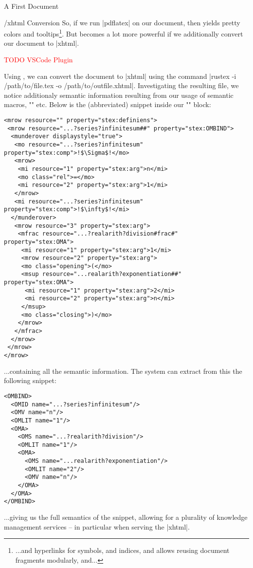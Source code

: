 \begin{sfragment}{A First \sTeX Document}
    \begin{sfragment}{\omdoc/xhtml Conversion}
      So, if we run |pdflatex| on our document, then \sTeX yields 
      pretty colors and
      tooltips\footnote{...and hyperlinks for symbols, and indices,
      and allows reusing document fragments modularly, and...}.
      But \sTeX becomes a lot more powerful if we additionally
      convert our document to |xhtml|.

      \textcolor{red}{TODO VSCode Plugin}

      Using \rustex, we can convert the document to |xhtml|
      using the command |rustex -i /path/to/file.tex -o /path/to/outfile.xhtml|.
      Investigating the resulting file, we notice additionaly semantic
      information resulting from our usage of semantic macros,
      \stexcode"\symref" etc. Below is the (abbreviated) snippet inside
      our \stexcode"" block:

      \begin{lstlisting}[escapechar=!]
<mrow resource="" property="stex:definiens">
 <mrow resource="...?series?infinitesum##" property="stex:OMBIND">
  <munderover displaystyle="true">
   <mo resource="...?series?infinitesum" property="stex:comp">!$\Sigma$!</mo>
   <mrow>
    <mi resource="1" property="stex:arg">n</mi>
    <mo class="rel">=</mo>
    <mi resource="2" property="stex:arg">1</mi>
   </mrow>
   <mi resource="...?series?infinitesum" property="stex:comp">!$\infty$!</mi>
  </munderover>
   <mrow resource="3" property="stex:arg">
    <mfrac resource="...?realarith?division#frac#" property="stex:OMA">
     <mi resource="1" property="stex:arg">1</mi>
     <mrow resource="2" property="stex:arg">
     <mo class="opening">(</mo>
     <msup resource="...realarith?exponentiation##" property="stex:OMA">
      <mi resource="1" property="stex:arg">2</mi>
      <mi resource="2" property="stex:arg">n</mi>
     </msup>
     <mo class="closing">)</mo>
    </mrow>
   </mfrac>
  </mrow>
 </mrow>
</mrow>
      \end{lstlisting}
      ...containing all the semantic information. The \mmt system
      can extract from this the following \openmath snippet:

      \begin{lstlisting}[escapechar=!]
<OMBIND>
  <OMID name="...?series?infinitesum"/>
  <OMV name="n"/>
  <OMLIT name="1"/>
  <OMA>
    <OMS name="...?realarith?division"/>
    <OMLIT name="1"/>
    <OMA>
      <OMS name="...realarith?exponentiation"/>
      <OMLIT name="2"/>
      <OMV name="n"/>
    </OMA>
  </OMA>
</OMBIND>
      \end{lstlisting}
      ...giving us the full semantics of the snippet, allowing for
      a plurality of knowledge management services -- in particular
      when serving the |xhtml|.


\end{sfragment}
\end{sfragment}
